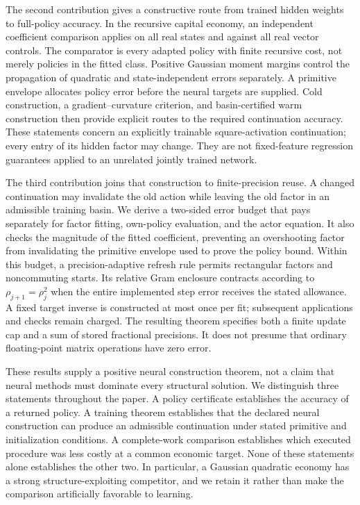 The second contribution gives a constructive route from trained hidden
weights to full-policy accuracy. In the recursive capital economy, an
independent coefficient comparison applies on all real states and against
all real vector controls. The comparator is every adapted policy with finite
recursive cost, not merely policies in the fitted class. Positive Gaussian
moment margins control the propagation of quadratic and state-independent
errors separately. A primitive envelope allocates policy error before the
neural targets are supplied. Cold construction, a gradient--curvature
criterion, and basin-certified warm construction then provide explicit routes
to the required continuation accuracy. These statements concern an explicitly
trainable square-activation continuation; every entry of its hidden factor
may change. They are not fixed-feature regression guarantees applied to an
unrelated jointly trained network.

The third contribution joins that construction to finite-precision reuse.
A changed continuation may invalidate the old action while leaving the old
factor in an admissible training basin. We derive a two-sided error budget
that pays separately for factor fitting, own-policy evaluation, and the actor
equation. It also checks the magnitude of the fitted coefficient, preventing
an overshooting factor from invalidating the primitive envelope used to prove
the policy bound. Within this budget, a precision-adaptive refresh rule permits
rectangular factors and noncommuting starts. Its relative Gram enclosure
contracts according to $\rho_{j+1}=\rho_j^2$ when the entire implemented
step error receives the stated allowance. A fixed target inverse is constructed
at most once per fit; subsequent applications and checks remain charged.
The resulting theorem specifies both a finite update cap and a sum of stored
fractional precisions. It does not presume that ordinary floating-point
matrix operations have zero error.

These results supply a positive neural construction theorem, not a claim
that neural methods must dominate every structural solution. We distinguish
three statements throughout the paper. A policy certificate establishes the
accuracy of a returned policy. A training theorem establishes that the declared
neural construction can produce an admissible continuation under stated
primitive and initialization conditions. A complete-work comparison establishes
which executed procedure was less costly at a common economic target. None
of these statements alone establishes the other two. In particular, a Gaussian
quadratic economy has a strong structure-exploiting competitor, and we retain
it rather than make the comparison artificially favorable to learning.

